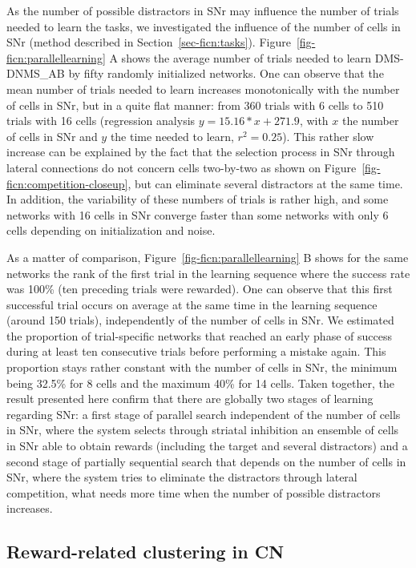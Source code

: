 \documentclass[
  11pt,
  a4paper,
]{scrbook}
\begin{document}
As the number of possible distractors in SNr may influence the number of
trials needed to learn the tasks, we investigated the influence of the
number of cells in SNr (method described in
Section~\ref{sec-ficn:tasks}). Figure~\ref{fig-ficn:parallellearning} A
shows the average number of trials needed to learn DMS-DNMS\_AB by fifty
randomly initialized networks. One can observe that the mean number of
trials needed to learn increases monotonically with the number of cells
in SNr, but in a quite flat manner: from 360 trials with 6 cells to 510
trials with 16 cells (regression analysis \(y= 15.16 * x + 271.9\), with
\(x\) the number of cells in SNr and \(y\) the time needed to learn,
\(r^2 = 0.25\)). This rather slow increase can be explained by the fact
that the selection process in SNr through lateral connections do not
concern cells two-by-two as shown on
Figure~\ref{fig-ficn:competition-closeup}, but can eliminate several
distractors at the same time. In addition, the variability of these
numbers of trials is rather high, and some networks with 16 cells in SNr
converge faster than some networks with only 6 cells depending on
initialization and noise.

As a matter of comparison, Figure~\ref{fig-ficn:parallellearning} B
shows for the same networks the rank of the first trial in the learning
sequence where the success rate was 100\% (ten preceding trials were
rewarded). One can observe that this first successful trial occurs on
average at the same time in the learning sequence (around 150 trials),
independently of the number of cells in SNr. We estimated the proportion
of trial-specific networks that reached an early phase of success during
at least ten consecutive trials before performing a mistake again. This
proportion stays rather constant with the number of cells in SNr, the
minimum being 32.5\% for 8 cells and the maximum 40\% for 14 cells.
Taken together, the result presented here confirm that there are
globally two stages of learning regarding SNr: a first stage of parallel
search independent of the number of cells in SNr, where the system
selects through striatal inhibition an ensemble of cells in SNr able to
obtain rewards (including the target and several distractors) and a
second stage of partially sequential search that depends on the number
of cells in SNr, where the system tries to eliminate the distractors
through lateral competition, what needs more time when the number of
possible distractors increases.

\subsection{Reward-related clustering in
CN}\label{sec-ficn:traceconditioning}
\end{document}
